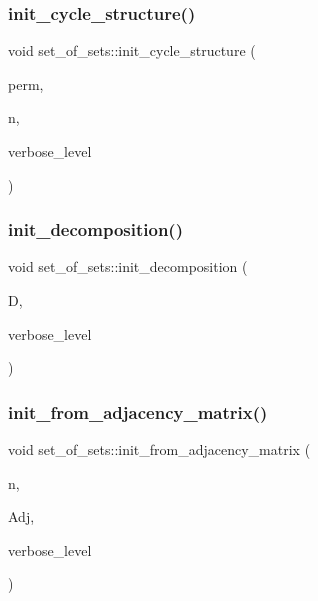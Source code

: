 \subsubsection{\texorpdfstring{init\+\_\+cycle\+\_\+structure()}{init\_cycle\_structure()}}
{\footnotesize\ttfamily void set\+\_\+of\+\_\+sets\+::init\+\_\+cycle\+\_\+structure (\begin{DoxyParamCaption}\item[{\mbox{\hyperlink{galois_8h_a09fddde158a3a20bd2dcadb609de11dc}{I\+NT}} $\ast$}]{perm,  }\item[{\mbox{\hyperlink{galois_8h_a09fddde158a3a20bd2dcadb609de11dc}{I\+NT}}}]{n,  }\item[{\mbox{\hyperlink{galois_8h_a09fddde158a3a20bd2dcadb609de11dc}{I\+NT}}}]{verbose\+\_\+level }\end{DoxyParamCaption})}

\mbox{\label{classset__of__sets_a6f4ff05e8dff907775cd00ba39352593}} 
\subsubsection{\texorpdfstring{init\+\_\+decomposition()}{init\_decomposition()}}
{\footnotesize\ttfamily void set\+\_\+of\+\_\+sets\+::init\+\_\+decomposition (\begin{DoxyParamCaption}\item[{\mbox{\hyperlink{classdecomposition}{decomposition}} $\ast$\&}]{D,  }\item[{\mbox{\hyperlink{galois_8h_a09fddde158a3a20bd2dcadb609de11dc}{I\+NT}}}]{verbose\+\_\+level }\end{DoxyParamCaption})}

\mbox{\label{classset__of__sets_ace9a38e27dd42625a10cf9682e01392a}} 
\subsubsection{\texorpdfstring{init\+\_\+from\+\_\+adjacency\+\_\+matrix()}{init\_from\_adjacency\_matrix()}}
{\footnotesize\ttfamily void set\+\_\+of\+\_\+sets\+::init\+\_\+from\+\_\+adjacency\+\_\+matrix (\begin{DoxyParamCaption}\item[{\mbox{\hyperlink{galois_8h_a09fddde158a3a20bd2dcadb609de11dc}{I\+NT}}}]{n,  }\item[{\mbox{\hyperlink{galois_8h_a09fddde158a3a20bd2dcadb609de11dc}{I\+NT}} $\ast$}]{Adj,  }\item[{\mbox{\hyperlink{galois_8h_a09fddde158a3a20bd2dcadb609de11dc}{I\+NT}}}]{verbose\+\_\+level }\end{DoxyParamCaption})}

